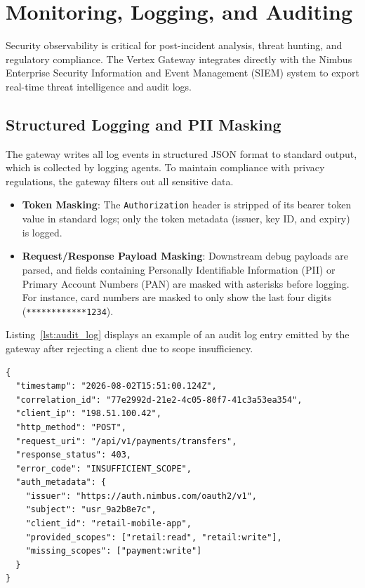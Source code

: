 \section{Monitoring, Logging, and Auditing}
\label{sec:monitoring_compliance}

Security observability is critical for post-incident analysis, threat hunting, and regulatory compliance. The Vertex Gateway integrates directly with the Nimbus Enterprise Security Information and Event Management (SIEM) system to export real-time threat intelligence and audit logs.

\subsection{Structured Logging and PII Masking}
The gateway writes all log events in structured JSON format to standard output, which is collected by logging agents. To maintain compliance with privacy regulations, the gateway filters out all sensitive data.
\begin{itemize}
    \item \textbf{Token Masking}: The \texttt{Authorization} header is stripped of its bearer token value in standard logs; only the token metadata (issuer, key ID, and expiry) is logged.
    \item \textbf{Request/Response Payload Masking}: Downstream debug payloads are parsed, and fields containing Personally Identifiable Information (PII) or Primary Account Numbers (PAN) are masked with asterisks before logging. For instance, card numbers are masked to only show the last four digits (\texttt{************1234}).
\end{itemize}

Listing~\ref{lst:audit_log} displays an example of an audit log entry emitted by the gateway after rejecting a client due to scope insufficiency.

\begin{lstlisting}[language={}, caption={JSON structured audit log event representing an unauthorized request.}, label={lst:audit_log}]
{
  "timestamp": "2026-08-02T15:51:00.124Z",
  "correlation_id": "77e2992d-21e2-4c05-80f7-41c3a53ea354",
  "client_ip": "198.51.100.42",
  "http_method": "POST",
  "request_uri": "/api/v1/payments/transfers",
  "response_status": 403,
  "error_code": "INSUFFICIENT_SCOPE",
  "auth_metadata": {
    "issuer": "https://auth.nimbus.com/oauth2/v1",
    "subject": "usr_9a2b8e7c",
    "client_id": "retail-mobile-app",
    "provided_scopes": ["retail:read", "retail:write"],
    "missing_scopes": ["payment:write"]
  }
}
\end{lstlisting}

